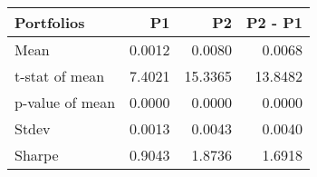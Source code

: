 \begin{tabular}{lrrr}
\toprule
Portfolios & P1 & P2 & P2 - P1 \\
\midrule
Mean & 0.0012 & 0.0080 & 0.0068 \\
t-stat of mean & 7.4021 & 15.3365 & 13.8482 \\
p-value of mean & 0.0000 & 0.0000 & 0.0000 \\
Stdev & 0.0013 & 0.0043 & 0.0040 \\
Sharpe & 0.9043 & 1.8736 & 1.6918 \\
\bottomrule
\end{tabular}
